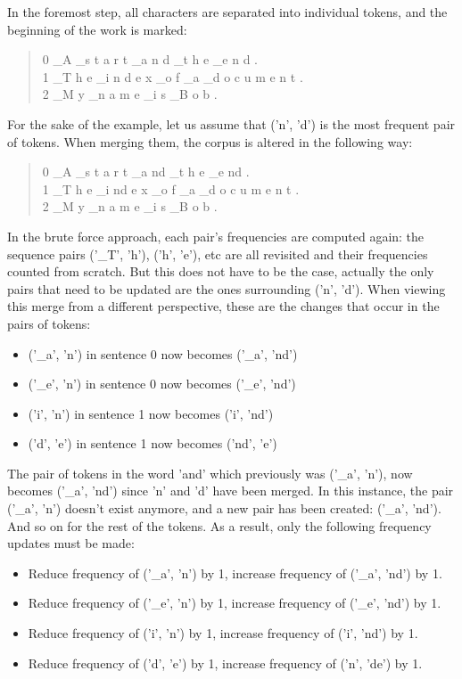 In the foremost step, all characters are separated into individual tokens, and the beginning of the work is marked:

\begin{quote}
	0	\_A \_s t a r t \_a n d \_t h e \_e n d .\\
	1 	\_T h e \_i n d e x \_o f \_a \_d o c u m e n t .\\
	2 	\_M y \_n a m e \_i s \_B o b .
\end{quote}

For the sake of the example, let us assume that ('n', 'd') is the most frequent pair of tokens. When merging them, the corpus is altered in the following way:

\begin{quote}
	0	\_A \_s t a r t \_a nd \_t h e \_e nd .\\
	1 	\_T h e \_i nd e x \_o f \_a \_d o c u m e n t .\\
	2 	\_M y \_n a m e \_i s \_B o b .
\end{quote}

In the brute force approach, each pair's frequencies are computed again: the sequence pairs ('\_T', 'h'), ('h', 'e'), etc are all revisited and their frequencies counted from scratch. But this does not have to be the case, actually the only pairs that need to be updated are the ones surrounding ('n', 'd'). When viewing this merge from a different perspective, these are the changes that occur in the pairs of tokens:

\begin{itemize}
	\item ('\_a', 'n') in sentence 0 now becomes ('\_a', 'nd')
	\item ('\_e', 'n') in sentence 0 now becomes ('\_e', 'nd')
	\item ('i', 'n') in sentence 1 now becomes ('i', 'nd')
	\item ('d', 'e') in sentence 1 now becomes ('nd', 'e')
\end{itemize}

The pair of tokens in the word 'and' which previously was ('\_a', 'n'), now becomes ('\_a', 'nd') since 'n' and 'd' have been merged. In this instance, the pair ('\_a', 'n') doesn't exist anymore, and a new pair has been created: ('\_a', 'nd'). And so on for the rest of the tokens. As a result, only the following frequency updates must be made:

\begin{itemize}
	\item Reduce frequency of ('\_a', 'n') by 1, increase frequency of ('\_a', 'nd') by 1.
	\item Reduce frequency of ('\_e', 'n') by 1, increase frequency of ('\_e', 'nd') by 1.
	\item Reduce frequency of ('i', 'n') by 1, increase frequency of ('i', 'nd') by 1.
	\item Reduce frequency of ('d', 'e') by 1, increase frequency of ('n', 'de') by 1.
\end{itemize}

